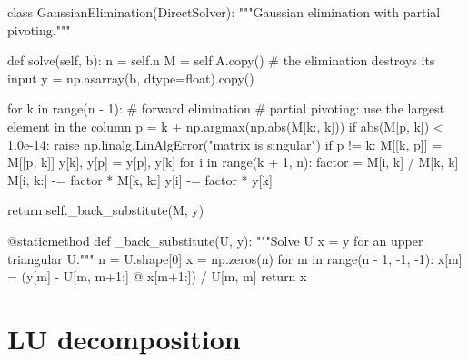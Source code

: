 \begin{Python}{}
class GaussianElimination(DirectSolver):
    """Gaussian elimination with partial pivoting."""

    def solve(self, b):
        n = self.n
        M = self.A.copy()                 # the elimination destroys its input
        y = np.asarray(b, dtype=float).copy()

        for k in range(n - 1):            # forward elimination
            # partial pivoting: use the largest element in the column
            p = k + np.argmax(np.abs(M[k:, k]))
            if abs(M[p, k]) < 1.0e-14:
                raise np.linalg.LinAlgError("matrix is singular")
            if p != k:
                M[[k, p]] = M[[p, k]]
                y[k], y[p] = y[p], y[k]
            for i in range(k + 1, n):
                factor = M[i, k] / M[k, k]
                M[i, k:] -= factor * M[k, k:]
                y[i] -= factor * y[k]

        return self._back_substitute(M, y)

    @staticmethod
    def _back_substitute(U, y):
        """Solve U x = y for an upper triangular U."""
        n = U.shape[0]
        x = np.zeros(n)
        for m in range(n - 1, -1, -1):
            x[m] = (y[m] - U[m, m+1:] @ x[m+1:]) / U[m, m]
        return x
\end{Python}

\section{LU decomposition}
\label{sec:lu}

